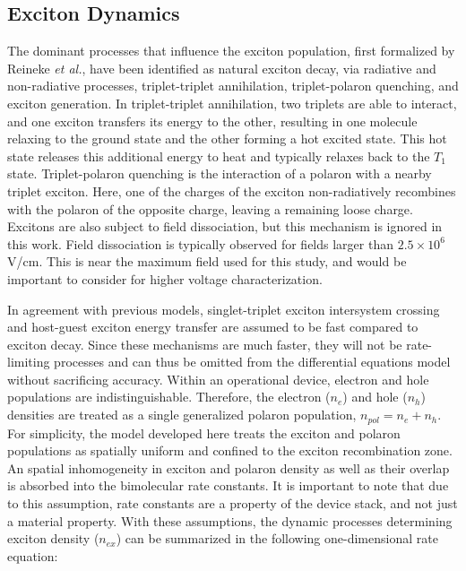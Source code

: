 \documentclass[../thesis.tex]{subfiles}
\begin{document}
\subsection{Exciton Dynamics}
The dominant processes that influence the exciton population, first formalized by Reineke \textit{et al.}\supercite{Reineke2007}, have been identified as natural exciton decay, via radiative and non-radiative processes, triplet-triplet annihilation, triplet-polaron quenching, and exciton generation.\supercite{Erickson2014,Song2010}
In triplet-triplet annihilation, two triplets are able to interact, and one exciton transfers its energy to the other, resulting in one molecule relaxing to the ground state and the other forming a hot excited state.
This hot state releases this additional energy to heat and typically relaxes back to the $T_1$ state.  
Triplet-polaron quenching is the interaction of a polaron with a nearby triplet exciton.
Here, one of the charges of the exciton non-radiatively recombines with the polaron of the opposite charge, leaving a remaining loose charge.
Excitons are also subject to field dissociation, but this mechanism is ignored in this work.
Field dissociation is typically observed for fields larger than $2.5 \times 10^6$ V/cm.  
This is near the maximum field used for this study, and would be important to consider for higher voltage characterization.

In agreement with previous models, singlet-triplet exciton intersystem crossing and host-guest exciton energy transfer are assumed to be fast compared to exciton decay.\supercite{Reineke2007,Baldo2000a,Turro1991a}
Since these mechanisms are much faster, they will not be rate-limiting processes and can thus be omitted from the differential equations model without sacrificing accuracy.
Within an operational device, electron and hole populations are indistinguishable.
Therefore, the electron ($n_e$) and hole ($n_h$) densities are treated as a single generalized polaron population, $n_{pol}=n_e+n_h$.
For simplicity, the model developed here treats the exciton and polaron populations as spatially uniform and confined to the exciton recombination zone.  An spatial inhomogeneity in exciton and polaron density as well as their overlap is absorbed into the bimolecular rate constants.
It is important to note that due to this assumption, rate constants are a property of the device stack, and not just a material property.
With these assumptions, the dynamic processes determining exciton density ($n_{ex}$) can be summarized in the following one-dimensional rate equation:
\end{document}
